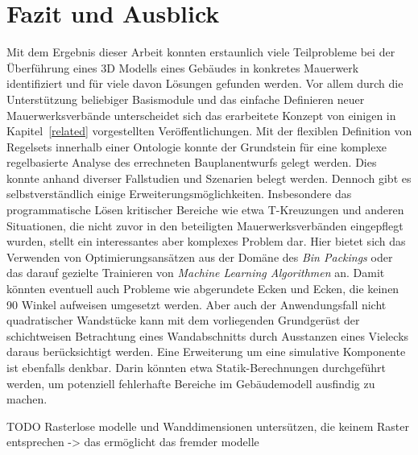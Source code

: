 \chapter{Fazit und Ausblick}
Mit dem Ergebnis dieser Arbeit konnten erstaunlich viele Teilprobleme bei der Überführung eines 3D Modells eines Gebäudes in konkretes Mauerwerk identifiziert und für viele davon Lösungen gefunden werden.
Vor allem durch die Unterstützung beliebiger Basismodule und das einfache Definieren neuer Mauerwerksverbände unterscheidet sich das erarbeitete Konzept von einigen in Kapitel~\ref{related} vorgestellten Veröffentlichungen.
Mit der flexiblen Definition von Regelsets innerhalb einer Ontologie konnte der Grundstein für eine komplexe regelbasierte Analyse des errechneten Bauplanentwurfs gelegt werden.
Dies konnte anhand diverser Fallstudien und Szenarien belegt werden.
Dennoch gibt es selbstverständlich einige Erweiterungsmöglichkeiten.
Insbesondere das programmatische Lösen kritischer Bereiche wie etwa T-Kreuzungen und anderen Situationen, die nicht zuvor in den beteiligten Mauerwerksverbänden eingepflegt wurden, stellt ein interessantes aber komplexes Problem dar.
Hier bietet sich das Verwenden von Optimierungsansätzen aus der Domäne des \textit{Bin Packings} oder das darauf gezielte Trainieren von \textit{Machine Learning Algorithmen} an.
Damit könnten eventuell auch Probleme wie abgerundete Ecken und Ecken, die keinen 90\textdegree{} Winkel aufweisen umgesetzt werden.
Aber auch der Anwendungsfall nicht quadratischer Wandstücke kann mit dem vorliegenden Grundgerüst der schichtweisen Betrachtung eines Wandabschnitts durch \glqq{}Ausstanzen\grqq{} eines Vielecks daraus berücksichtigt werden.
Eine Erweiterung um eine simulative Komponente ist ebenfalls denkbar.
Darin könnten etwa Statik-Berechnungen durchgeführt werden, um potenziell fehlerhafte Bereiche im Gebäudemodell ausfindig zu machen.

TODO Rasterlose modelle und Wanddimensionen untersützen, die keinem Raster entsprechen -> das ermöglicht das fremder modelle